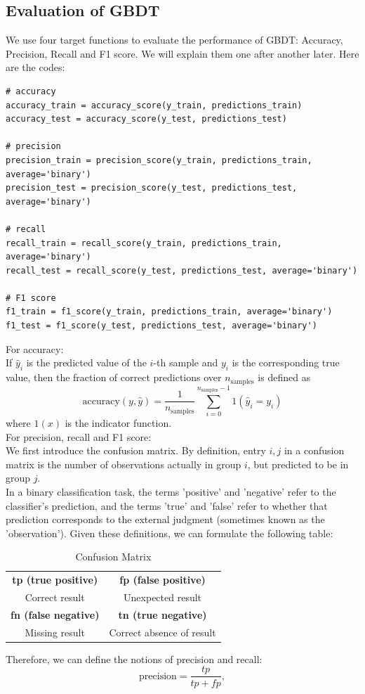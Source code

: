 \documentclass[12pt]{article}
\begin{document}
\subsection{Evaluation of GBDT}
We use four target functions to evaluate the performance of GBDT: Accuracy, Precision, Recall and F1 score. We will explain them one after another later. Here are the codes:
\begin{verbatim}
# accuracy
accuracy_train = accuracy_score(y_train, predictions_train)
accuracy_test = accuracy_score(y_test, predictions_test)

# precision
precision_train = precision_score(y_train, predictions_train, average='binary')
precision_test = precision_score(y_test, predictions_test, average='binary')

# recall
recall_train = recall_score(y_train, predictions_train, average='binary')
recall_test = recall_score(y_test, predictions_test, average='binary')

# F1 score
f1_train = f1_score(y_train, predictions_train, average='binary')
f1_test = f1_score(y_test, predictions_test, average='binary')
\end{verbatim}
For accuracy:\\
If $\hat{y}_i$ is the predicted value of the $i$-th sample and $y_i$ is the corresponding true value, then the fraction of correct predictions over $n_{\text{samples}}$ is defined as
\[
\text{accuracy}(y, \hat{y}) = \frac{1}{n_{\text{samples}}} \sum_{i=0}^{n_{\text{samples}}-1} 1(\hat{y}_i = y_i)
\]
where $1(x)$ is the indicator function.\\
For precision, recall and F1 score:\\
We first introduce the confusion matrix. By definition, entry $i,j$ in a confusion matrix is the number of observations actually in group $i$, but predicted to be in group $j$. \\
In a binary classification task, the terms 'positive' and 'negative' refer to the classifier’s prediction, and the terms 'true' and 'false' refer to whether that prediction corresponds to the external judgment (sometimes known as the 'observation'). Given these definitions, we can formulate the following table:
\begin{table}[h]
\centering
\begin{tabular}{|c|c|}
\hline
\textbf{tp (true positive)} & \textbf{fp (false positive)} \\
Correct result & Unexpected result \\
\hline
\textbf{fn (false negative)} & \textbf{tn (true negative)} \\
Missing result & Correct absence of result \\
\hline
\end{tabular}
\caption*{Confusion Matrix}
\end{table}
Therefore, we can define the notions of precision and recall:
\[
\text{precision} = \frac{tp}{tp + fp},
\]
\end{document}
